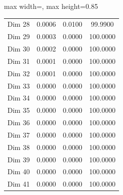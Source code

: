 \begin{table}[H]
\begin{adjustbox}{max width=\textwidth, max height=0.85\textheight}
\begin{tabular}{|c|c|c|c|}
Dim 28 & 0.0006 & 0.0100 & 99.9900 \\
Dim 29 & 0.0003 & 0.0000 & 100.0000 \\
Dim 30 & 0.0002 & 0.0000 & 100.0000 \\
Dim 31 & 0.0001 & 0.0000 & 100.0000 \\
Dim 32 & 0.0001 & 0.0000 & 100.0000 \\
Dim 33 & 0.0000 & 0.0000 & 100.0000 \\
Dim 34 & 0.0000 & 0.0000 & 100.0000 \\
Dim 35 & 0.0000 & 0.0000 & 100.0000 \\
Dim 36 & 0.0000 & 0.0000 & 100.0000 \\
Dim 37 & 0.0000 & 0.0000 & 100.0000 \\
Dim 38 & 0.0000 & 0.0000 & 100.0000 \\
Dim 39 & 0.0000 & 0.0000 & 100.0000 \\
Dim 40 & 0.0000 & 0.0000 & 100.0000 \\
Dim 41 & 0.0000 & 0.0000 & 100.0000 \\
\hline
\end{tabular}
\end{adjustbox}
\end{table}